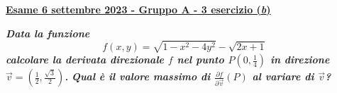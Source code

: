 \documentclass[a4paper]{article}
\newcommand{\definition}[1]{\textcolor{Red3}{\textbf{#1}}}
\newcommand{\example}[1]{\textcolor{Green4}{\textbf{#1}}}
\begin{document}
	\begin{flushleft}
		\label{exam: esame 06 settembre 2023 - Gruppo A - 3 esercizio (b)}
		\hypertarget{
			exam: esame 06 settembre 2023 - Gruppo A - 3 esercizio (b)
		}{
			\definition{\underline{Esame 6 settembre 2023 - Gruppo A - 3 esercizio (\emph{b})}}
		}
	\end{flushleft}
	\example{\emph{Data la funzione}
	\begin{equation*}
		f\left(x,y\right) = \sqrt{1-x^{2}-4y^{2}} - \sqrt{2x+1}
	\end{equation*}
	\emph{calcolare la derivata direzionale $f$ nel punto $P\left(0,\frac{1}{4}\right)$ in direzione $\overrightarrow{v} = \left(\frac{1}{2}, \frac{\sqrt{3}}{2}\right)$.}}\newline
	\example{\emph{Qual è il valore massimo di $\frac{\partial f}{\partial \overrightarrow{v}}\left(P\right)$ al variare di $\overrightarrow{v}$?}}\newline
\end{document}
